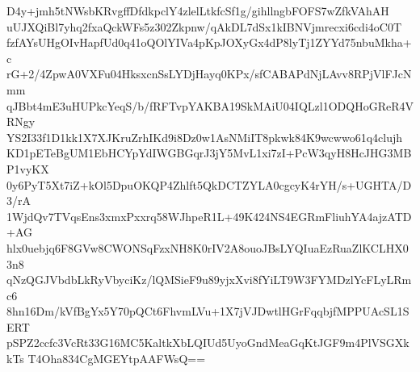 D4y+jmh5tNWsbKRvgffDfdkpclY4zlelLtkfcSf1g/gihllngbFOFS7wZfkVAhAH
uUJXQiBl7yhq2fxaQckWFs5z302Zkpnw/qAkDL7dSx1kIBNVjmrecxi6cdi4oC0T
fzfAYsUHgOIvHapfUd0q41oQOlYIVa4pKpJOXyGx4dP8lyTj1ZYYd75nbuMkha+c
rG+2/4ZpwA0VXFu04HksxcnSsLYDjHayq0KPx/sfCABAPdNjLAvv8RPjVlFJcNmm
qJBbt4mE3uHUPkcYeqS/b/fRFTvpYAKBA19SkMAiU04IQLzl1ODQHoGReR4VRNgy
YS2I33f1D1kk1X7XJKruZrhIKd9i8Dz0w1AsNMiIT8pkwk84K9wcwwo61q4clujh
KD1pETeBgUM1EbHCYpYdIWGBGqrJ3jY5MvL1xi7zI+PcW3qyH8HcJHG3MBP1vyKX
0y6PyT5Xt7iZ+kOl5DpuOKQP4Zhlft5QkDCTZYLA0cgcyK4rYH/s+UGHTA/D3/rA
1WjdQv7TVqsEns3xmxPxxrq58WJhpeR1L+49K424NS4EGRmFliuhYA4ajzATD+AG
hlx0uebjq6F8GVw8CWONSqFzxNH8K0rIV2A8ouoJBsLYQIuaEzRuaZlKCLHX03n8
qNzQGJVbdbLkRyVbyciKz/lQMSieF9u89yjxXvi8fYiLT9W3FYMDzlYcFLyLRmc6
8hn16Dm/kVfBgYx5Y70pQCt6FhvmLVu+1X7jVJDwtlHGrFqqbjfMPPUAcSL1SERT
pSPZ2ccfc3VcRt33G16MC5KaltkXbLQIUd5UyoGndMeaGqKtJGF9m4PlVSGXkkTs
T4Oha834CgMGEYtpAAFWsQ==
